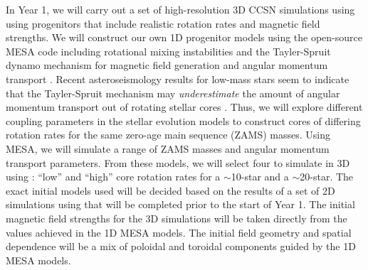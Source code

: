 In Year 1, we will carry out a set of high-resolution 3D CCSN simulations using \sparkmone using progenitors that include realistic rotation rates and magnetic field strengths.
We will construct our own 1D progenitor models using the open-source MESA code \citep{Paxton:2011, Paxton:2013, Paxton:2015} including rotational mixing instabilities and the Tayler-Spruit dynamo mechanism for magnetic field generation and angular momentum transport \citep{Spruit:2002, Heger:2005}.
Recent asteroseismology results for low-mass stars seem to indicate that the Tayler-Spruit mechanism may {\it underestimate} the amount of angular momentum transport out of rotating stellar cores \citep{Cantiello:2014}.
Thus, we will explore different coupling parameters in the stellar evolution models to construct cores of differing rotation rates for the same zero-age main sequence (ZAMS) masses.
Using MESA, we will simulate a range of ZAMS masses and angular momentum transport parameters.
From these models, we will select four to simulate in 3D using \sparkmone: ``low'' and ``high'' core rotation rates for a $\sim$10-\msun star and a $\sim$20-\msun star.
The exact initial models used will be decided based on the results of a set of 2D simulations using \sparkmone that will be completed prior to the start of Year 1.
The initial magnetic field strengths for the 3D simulations will be taken directly from the values achieved in the 1D MESA models.
The initial field geometry and spatial dependence will be a mix of poloidal and toroidal components guided by the 1D MESA models.


